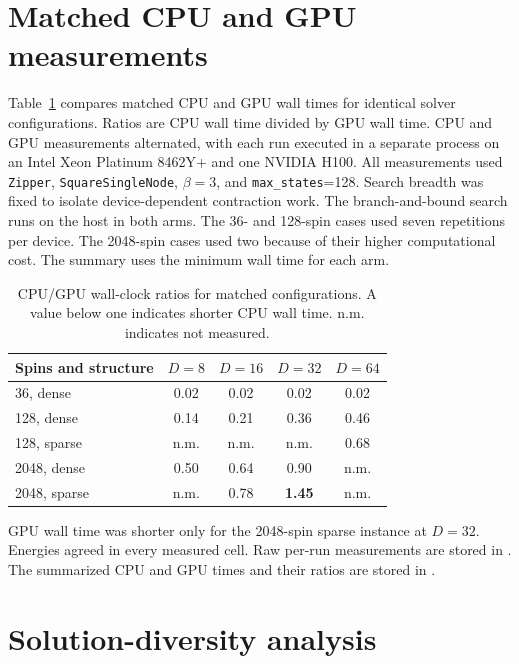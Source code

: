 
\section{Matched CPU and GPU measurements}
\label{sec:supp-crossover}

Table~\ref{tab:supp-crossover} compares matched CPU and GPU wall times for
identical solver configurations. Ratios are CPU wall time divided by GPU wall
time. CPU and GPU measurements alternated, with each run executed in a separate
process on an Intel Xeon Platinum 8462Y+ and one NVIDIA H100. All measurements used \texttt{Zipper},
\texttt{SquareSingleNode}, $\beta=3$, and \texttt{max\_states}=128. Search
breadth was fixed to isolate device-dependent contraction work. The
branch-and-bound search runs on the host in both arms. The 36- and 128-spin cases
used seven repetitions per device. The 2048-spin cases used two because of their
higher computational cost. The summary uses the minimum wall time for each arm.

\begin{table}[htbp]
\small
\centering
\caption{CPU/GPU wall-clock ratios for matched configurations. A value below
one indicates shorter CPU wall time. n.m. indicates not measured.}
\label{tab:supp-crossover}
\begin{tabular}{@{}lcccc@{}}
\toprule
Spins and structure & $D{=}8$ & $D{=}16$ & $D{=}32$ & $D{=}64$ \\
\midrule
36, dense     & 0.02 & 0.02 & 0.02 & 0.02 \\
128, dense    & 0.14 & 0.21 & 0.36 & 0.46 \\
128, sparse   & n.m. & n.m. & n.m. & 0.68 \\
2048, dense   & 0.50 & 0.64 & 0.90 & n.m. \\
2048, sparse  & n.m. & 0.78 & \textbf{1.45} & n.m. \\
\bottomrule
\end{tabular}
\end{table}

GPU wall time was shorter only for the 2048-spin sparse instance at $D=32$.
Energies agreed in every measured cell. Raw per-run measurements are stored in
. The summarized CPU and GPU times and their ratios
are stored in .
\FloatBarrier

\section{Solution-diversity analysis}
\label{sec:supp-diversity}

